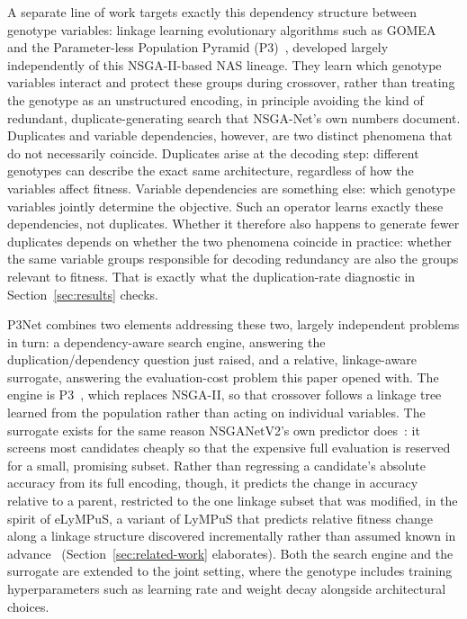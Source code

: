 A separate line of work targets exactly this dependency structure between genotype variables: linkage learning evolutionary algorithms such as GOMEA~\citep{thierens2011optimal} and the Parameter-less Population Pyramid (P3)~\citep{goldman2014parameterless}, developed largely independently of this NSGA-II-based NAS lineage. They learn which genotype variables interact and protect these groups during crossover, rather than treating the genotype as an unstructured encoding, in principle avoiding the kind of redundant, duplicate-generating search that NSGA-Net's own numbers document. Duplicates and variable dependencies, however, are two distinct phenomena that do not necessarily coincide. Duplicates arise at the decoding step: different genotypes can describe the exact same architecture, regardless of how the variables affect fitness. Variable dependencies are something else: which genotype variables jointly determine the objective. Such an operator learns exactly these dependencies, not duplicates. Whether it therefore also happens to generate fewer duplicates depends on whether the two phenomena coincide in practice: whether the same variable groups responsible for decoding redundancy are also the groups relevant to fitness. That is exactly what the duplication-rate diagnostic in Section~\ref{sec:results} checks.

P3Net combines two elements addressing these two, largely independent problems in turn: a dependency-aware search engine, answering the duplication/dependency question just raised, and a relative, linkage-aware surrogate, answering the evaluation-cost problem this paper opened with. The engine is P3~\citep{goldman2014parameterless}, which replaces NSGA-II, so that crossover follows a linkage tree learned from the population rather than acting on individual variables. The surrogate exists for the same reason NSGANetV2's own predictor does~\citep{lu2020nsganetv2}: it screens most candidates cheaply so that the expensive full evaluation is reserved for a small, promising subset. Rather than regressing a candidate's absolute accuracy from its full encoding, though, it predicts the change in accuracy relative to a parent, restricted to the one linkage subset that was modified, in the spirit of eLyMPuS, a variant of LyMPuS that predicts relative fitness change along a linkage structure discovered incrementally rather than assumed known in advance~\citep{przewozniczek2026lympus} (Section~\ref{sec:related-work} elaborates). Both the search engine and the surrogate are extended to the joint setting, where the genotype includes training hyperparameters such as learning rate and weight decay alongside architectural choices.

